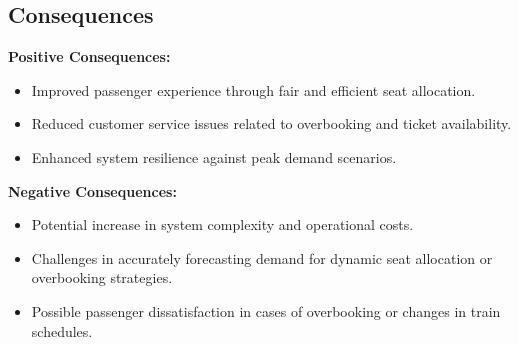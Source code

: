 \subsection*{Consequences}
\textbf{Positive Consequences:}
\begin{itemize}
    \item Improved passenger experience through fair and efficient seat allocation.
    \item Reduced customer service issues related to overbooking and ticket availability.
    \item Enhanced system resilience against peak demand scenarios.
\end{itemize}
\textbf{Negative Consequences:}
\begin{itemize}
    \item Potential increase in system complexity and operational costs.
    \item Challenges in accurately forecasting demand for dynamic seat allocation or overbooking strategies.
    \item Possible passenger dissatisfaction in cases of overbooking or changes in train schedules.
\end{itemize}